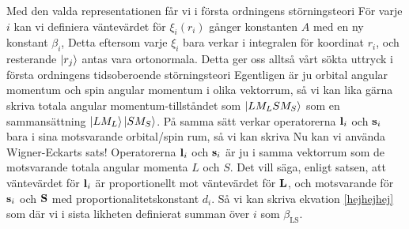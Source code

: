 Med den valda representationen får vi i första ordningens störningsteori
\newcommand{\braLS}{\bra{L M_L S M_S}}
\newcommand{\ketLS}{\ket{L M_L S M_S}}
För varje $i$ kan vi definiera väntevärdet för $\xi_i(r_i)$ gånger konstanten $A$ med en ny konstant $\beta_i$,
Detta eftersom varje $\xi_i$ bara verkar i integralen för koordinat $r_i$, och resterande $\ket{r_j}$ antas vara ortonormala. 
Detta ger oss alltså vårt sökta uttryck i första ordningens tidsoberoende störningsteori
Egentligen är ju orbital angular momentum och spin angular momentum i olika vektorrum, så vi kan lika gärna skriva totala angular
momentum-tillståndet som $\ket{L M_L S M_S}$ som en sammansättning $\ket{L M_L}\ket{S M_S}$. På samma sätt verkar operatorerna $\mathbf{l}_i$
och $\mathbf{s}_i$ bara i sina motsvarande orbital/spin rum, så vi kan skriva
Nu kan vi använda Wigner-Eckarts sats! Operatorerna $\mathbf{l}_i$ och $\mathbf{s}_i$ är ju i samma vektorrum som de motsvarande totala angular momenta $L$ och $S$.
Det vill säga, enligt satsen, att väntevärdet för $\mathbf{l}_i$ är proportionellt mot väntevärdet för $\mathbf{L}$,
och motsvarande för $\mathbf{s}_i$ och $\mathbf{S}$ med proportionalitetskonstant $d_i$. Så vi kan skriva ekvation \eqref{hejhejhej} som
där vi i sista likheten definierat summan över $i$ som $\beta_{\text{LS}}$.
